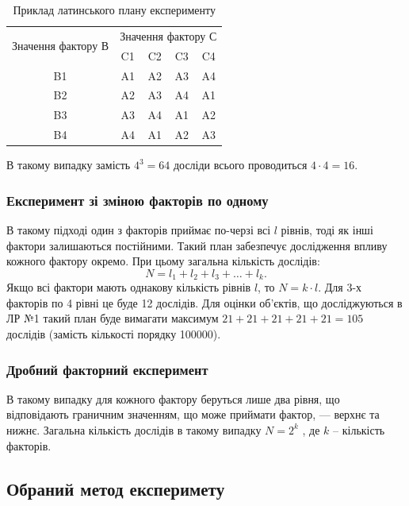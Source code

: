 \begin{table}[!ht]
\centering
\caption{Приклад латинського плану експерименту}
\label{t:latin_experiment}
\begin{tabular}{|c|c|c|c|c|}
\hline
\multirow{2}{*}{Значення  фактору В} & \multicolumn{4}{c|}{Значення фактору С} \\ \cline{2-5} 
 & C1 & C2 & C3 & C4 \\ \hline
B1 & A1 & A2 & A3 & A4 \\ \hline
B2 & A2 & A3 & A4 & A1 \\ \hline
B3 & A3 & A4 & A1 & A2 \\ \hline
B4 & A4 & A1 & A2 & A3 \\ \hline
\end{tabular}
\end{table}

В такому випадку замість $4^3 = 64$ досліди всього проводиться $4 \cdot 4=16$.

\subsubsection{Експеримент зі зміною факторів по одному}

В такому підході один з факторів приймає по-черзі всі $l$ рівнів, тоді як інші фактори залишаються
постійними. Такий план забезпечує дослідження впливу кожного фактору окремо. При цьому загальна
кількість дослідів:
\begin{equation}
  \label{eq:exp_one_by_one}
  N = l_1 + l_2 +l_3+ \ldots + l_k.
\end{equation}
Якщо всі фактори мають однакову кількість рівнів $l$, то $N = k \cdot l$. Для 3-х факторів по 4
рівні це буде 12 дослідів. Для оцінки об’єктів, що досліджуються в ЛР №1 такий план буде вимагати
максимум $21+21+21+21+21 = 105$ дослідів (замість кількості порядку 100000).

\subsubsection{Дробний факторний експеримент}

В такому випадку для кожного фактору беруться лише два рівня, що відповідають граничним значенням,
що може приймати фактор, --- верхнє та нижнє. Загальна кількість дослідів в такому випадку $N = 2^k$ , де
$k$ – кількість факторів.

\subsection{Обраний метод експеримету}

